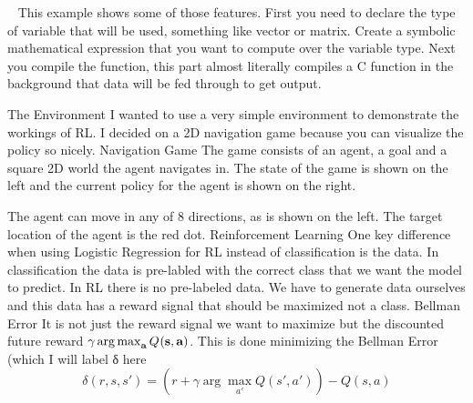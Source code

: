   
This example shows some of those features. First you need to declare the type of variable that will be used, something like vector or matrix. Create a symbolic mathematical expression that you want to compute over the variable type. Next you compile the function, this part almost literally compiles a C function in the background that data will be fed through to get output.

The Environment
I wanted to use a very simple environment to demonstrate the workings of RL. I decided on a 2D navigation game because you can visualize the policy so nicely.
Navigation Game
The game consists of an agent, a goal and a square 2D world the agent navigates in. The state of the game is shown on the left and the current policy for the agent is shown on the right.

The agent can move in any of $8$ directions, as is shown on the left. The target location of the agent is the red dot. 
Reinforcement Learning
One key difference when using Logistic Regression for RL instead of classification is the data. In classification the data is pre-labled with the correct class that we want the model to predict. In RL there is no pre-labeled data. We have to generate data ourselves and this data has a reward signal that should be maximized not a class.
Bellman Error
It is not just the reward signal we want to maximize but the discounted future reward $\gamma \operatorname*{arg\,max}_{\textbf{a}} Q_{}(\textbf{s},\textbf{a})$. This is done minimizing the Bellman Error (which I will label δ here
\[δ(r,s,s′)=(r+γ \arg\max_{a′}Q(s′,a′))−Q(s,a)\]